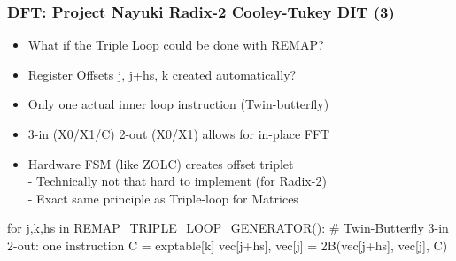 \documentclass[slidestop]{beamer}
\begin{document}
\begin{frame}[fragile]
\frametitle{DFT: Project Nayuki Radix-2 Cooley-Tukey DIT (3)}

 \begin{itemize}
    \item What if the Triple Loop could be done with REMAP?
    \item Register Offsets j, j+hs, k created automatically?
    \item Only one actual inner loop instruction (Twin-butterfly)
    \item 3-in (X0/X1/C) 2-out (X0/X1) allows for in-place FFT
    \item Hardware FSM (like ZOLC) creates offset triplet\\
        - Technically not that hard to implement (for Radix-2)\\
        - Exact same principle as Triple-loop for Matrices
  \end{itemize}

\begin{semiverbatim}
for j,k,hs in REMAP_TRIPLE_LOOP_GENERATOR():
            # Twin-Butterfly 3-in 2-out: one instruction
            C = exptable[k]
            vec[j+hs], vec[j] = 2B(vec[j+hs], vec[j], C)
\end{semiverbatim}

\end{frame}

\end{document}
